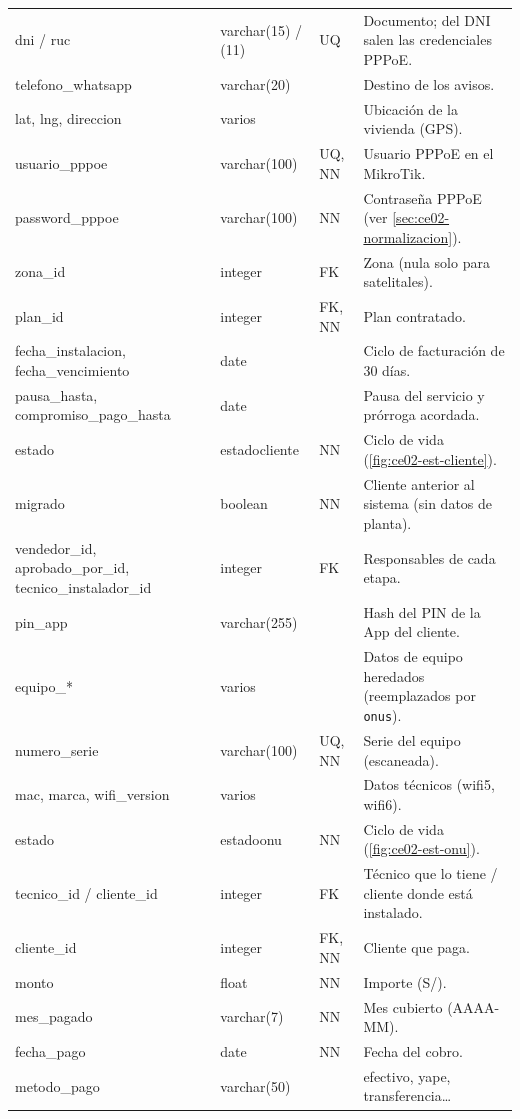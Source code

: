 {\begin{longtable}{L{3.4cm}L{2.5cm}L{1.4cm}L{6.4cm}}
dni / ruc & varchar(15) / (11) & UQ & Documento; del DNI salen las credenciales PPPoE. \\
telefono\_whatsapp & varchar(20) & & Destino de los avisos. \\
lat, lng, direccion & varios & & Ubicación de la vivienda (GPS). \\
usuario\_pppoe & varchar(100) & UQ, NN & Usuario PPPoE en el MikroTik. \\
password\_pppoe & varchar(100) & NN & Contraseña PPPoE (ver \cref{sec:ce02-normalizacion}). \\
zona\_id & integer & FK & Zona (nula solo para satelitales). \\
plan\_id & integer & FK, NN & Plan contratado. \\
fecha\_instalacion, fecha\_vencimiento & date & & Ciclo de facturación de 30 días. \\
pausa\_hasta, compromiso\_pago\_hasta & date & & Pausa del servicio y prórroga acordada. \\
estado & estadocliente & NN & Ciclo de vida (\cref{fig:ce02-est-cliente}). \\
migrado & boolean & NN & Cliente anterior al sistema (sin datos de planta). \\
vendedor\_id, aprobado\_por\_id, tecnico\_instalador\_id & integer & FK & Responsables de cada etapa. \\
pin\_app & varchar(255) & & Hash del PIN de la App del cliente. \\
equipo\_* & varios & & Datos de equipo heredados (reemplazados por \texttt{onus}). \\
numero\_serie & varchar(100) & UQ, NN & Serie del equipo (escaneada). \\
mac, marca, wifi\_version & varios & & Datos técnicos (wifi5, wifi6). \\
estado & estadoonu & NN & Ciclo de vida (\cref{fig:ce02-est-onu}). \\
tecnico\_id / cliente\_id & integer & FK & Técnico que lo tiene / cliente donde está instalado. \\
cliente\_id & integer & FK, NN & Cliente que paga. \\
monto & float & NN & Importe (S/). \\
mes\_pagado & varchar(7) & NN & Mes cubierto (AAAA-MM). \\
fecha\_pago & date & NN & Fecha del cobro. \\
metodo\_pago & varchar(50) & & efectivo, yape, transferencia\ldots \\

\end{longtable}}
